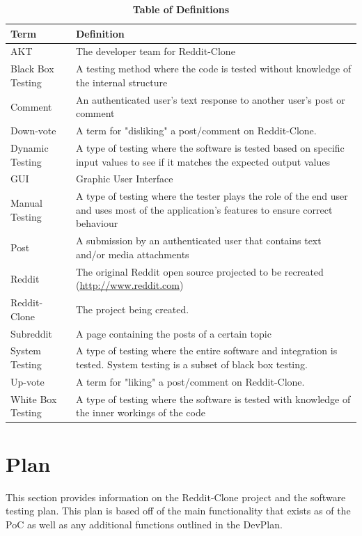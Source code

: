 \documentclass[12pt,fleqn]{article}
\begin{document}
\begin{table}[ht]
\caption{\textbf{Table of Definitions}} \label{Definitions}
\begin{tabularx}{\textwidth}{p{4cm}X}
\toprule
\textbf{Term} & \textbf{Definition}\\
\midrule
AKT & The developer team for Reddit-Clone\\
\leavevmode\color{red}Black Box Testing & \leavevmode\color{red}A testing method where the code is tested without knowledge of the internal structure \\
Comment & An authenticated user's text response to another user's post or comment \\
\leavevmode\color{red}Down-vote & \leavevmode\color{red}A term for "disliking" a post/comment on Reddit-Clone. \\
\leavevmode\color{red}Dynamic Testing & \leavevmode\color{red}A type of testing where the software is tested based on specific input values to see if it matches the expected output values \\
GUI & Graphic User Interface \\ 
\leavevmode\color{red}Manual Testing & A\leavevmode\color{red} type of testing where the tester plays the role of the end user and uses most of the application's features to ensure correct behaviour \\
Post & A submission by an authenticated user that contains text and/or media attachments \\
Reddit & The original Reddit open source projected to be recreated (\url{http://www.reddit.com})\\
Reddit-Clone & The project being created.\\
Subreddit & A page containing the posts of a certain topic \\
\leavevmode\color{red}System Testing & \leavevmode\color{red}A type of testing where the entire software and integration is tested. System testing is a subset of black box testing.\\
\leavevmode\color{red}Up-vote & \leavevmode\color{red}A term for "liking" a post/comment on Reddit-Clone.  \\
\leavevmode\color{red}White Box Testing & \leavevmode\color{red}A type of testing where the software is tested with knowledge of the inner workings of the code \\
\bottomrule
\end{tabularx}
\end{table}	

\pagebreak
\section {Plan}
This section provides information on the Reddit-Clone project and the software testing plan. This plan is based off of the main functionality that exists as of the PoC as well as any additional functions outlined in the DevPlan.
\end{document}
